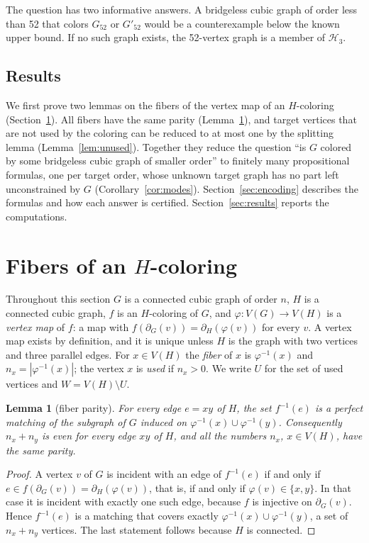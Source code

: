 \documentclass[11pt]{article}
\newtheorem{lemma}[theorem]{Lemma}
\theoremstyle{definition}
\theoremstyle{remark}
\newcommand{\Hthree}{\mathcal{H}_3}
\newcommand{\Ga}{G_{52}}
\newcommand{\Gb}{G'_{52}}
\begin{document}
The question has two informative answers. A bridgeless cubic graph of order less than 52 that
colors $\Ga$ or $\Gb$ would be a counterexample below the known upper bound. If no such graph
exists, the 52-vertex graph is a member of $\Hthree$.

\subsection{Results}

We first prove two lemmas on the fibers of the vertex map of an $H$-coloring
(Section~\ref{sec:fibers}). All fibers have the same parity (Lemma~\ref{lem:parity}), and target
vertices that are not used by the coloring can be reduced to at most one by the splitting lemma
(Lemma~\ref{lem:unused}). Together they reduce the question ``is $G$ colored by some bridgeless
cubic graph of smaller order'' to finitely many propositional formulas, one per target order,
whose unknown target graph has no part left unconstrained by $G$
(Corollary~\ref{cor:modes}). Section~\ref{sec:encoding} describes the formulas and how each answer
is certified. Section~\ref{sec:results} reports the computations.

\section{Fibers of an \texorpdfstring{$H$}{H}-coloring}\label{sec:fibers}

Throughout this section $G$ is a connected cubic graph of order $n$, $H$ is a connected cubic
graph, $f$ is an $H$-coloring of $G$, and $\varphi : V(G) \to V(H)$ is a \emph{vertex map} of $f$:
a map with $f(\partial_G(v)) = \partial_H(\varphi(v))$ for every $v$. A vertex map exists by
definition, and it is unique unless $H$ is the graph with two vertices and three parallel edges.
For $x \in V(H)$ the \emph{fiber} of $x$ is $\varphi^{-1}(x)$ and $n_x = |\varphi^{-1}(x)|$; the
vertex $x$ is \emph{used} if $n_x > 0$. We write $U$ for the set of used vertices and
$W = V(H) \setminus U$.

\begin{lemma}[fiber parity]\label{lem:parity}
For every edge $e = xy$ of $H$, the set $f^{-1}(e)$ is a perfect matching of the subgraph of $G$
induced on $\varphi^{-1}(x) \cup \varphi^{-1}(y)$. Consequently $n_x + n_y$ is even for every edge
$xy$ of $H$, and all the numbers $n_x$, $x \in V(H)$, have the same parity.
\end{lemma}

\begin{proof}
A vertex $v$ of $G$ is incident with an edge of $f^{-1}(e)$ if and only if
$e \in f(\partial_G(v)) = \partial_H(\varphi(v))$, that is, if and only if
$\varphi(v) \in \{x, y\}$. In that case it is incident with exactly one such edge, because $f$ is
injective on $\partial_G(v)$. Hence $f^{-1}(e)$ is a matching that covers exactly
$\varphi^{-1}(x) \cup \varphi^{-1}(y)$, a set of $n_x + n_y$ vertices. The last statement follows
because $H$ is connected.
\end{proof}
\end{document}
